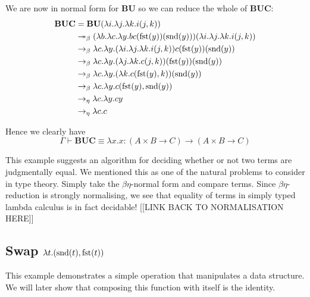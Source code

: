 \begin{example}
    We are now in normal form for $\mathbf{B} \mathbf{U}$ so we can reduce the whole of $\mathbf{B} \mathbf{U} \mathbf{C}$:
    \begin{equation*}
        \begin{aligned}
            \mathbf{B} \mathbf{U} \mathbf{C} &= \mathbf{B} \mathbf{U} (\lambda i . \lambda j . \lambda k . i (j , k)) \\
            &\twoheadrightarrow_{\beta} (\lambda b . \lambda c . \lambda y. b c(\mathrm{fst}(y))(\mathrm{snd}(y))) (\lambda i . \lambda j . \lambda k . i (j , k)) \\
            &\to_{\beta} \lambda c . \lambda y.  (\lambda i . \lambda j . \lambda k . i (j , k)) c(\mathrm{fst}(y))(\mathrm{snd}(y)) \\
            &\to_{\beta} \lambda c . \lambda y.  (\lambda j . \lambda k . c (j , k)) (\mathrm{fst}(y))(\mathrm{snd}(y)) \\
            &\to_{\beta} \lambda c . \lambda y.  (\lambda k . c (\mathrm{fst}(y) , k)) (\mathrm{snd}(y)) \\
            &\to_{\beta} \lambda c . \lambda y.  c (\mathrm{fst}(y) , \mathrm{snd}(y))  \\
            &\to_{\eta} \lambda c . \lambda y . c y \\
            &\to_{\eta} \lambda c . c
        \end{aligned}
    \end{equation*}
    
    Hence we clearly have
    $$
        \Gamma \vdash \mathbf{B} \mathbf{U} \mathbf{C} \equiv \lambda x . x : (A \times B \to C) \to (A \times B \to C)
    $$
\end{example}

\begin{remark}
    This example suggests an algorithm for deciding whether or not two terms are judgmentally equal. 
    We mentioned this as one of the natural problems to consider in type theory.
    Simply take the $\beta \eta$-normal form and compare terms. Since $\beta \eta$-reduction is strongly normalising, we see that equality of terms in simply typed lambda calculus is in fact decidable! [[LINK BACK TO NORMALISATION HERE]]
\end{remark}

\subsection{Swap \texorpdfstring{$\lambda t . (\mathrm{snd}(t), \mathrm{fst}(t))$}{}}

This example demonstrates a simple operation that manipulates a data structure. We will later show that composing this function with itself is the identity.

